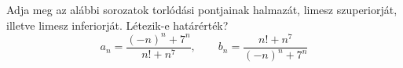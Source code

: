 \documentclass[11pt]{scrartcl}
\begin{document}
Adja meg az alábbi sorozatok torlódási pontjainak halmazát, limesz
szuperiorját, illetve limesz inferiorját. Létezik-e határérték?
\[
	a_n = \frac{(-n)^n + 7^n}{n! + n^7}, \qquad
	b_n = \frac{n! + n^7}{(-n)^n + 7^n}
\]
\end{document}
